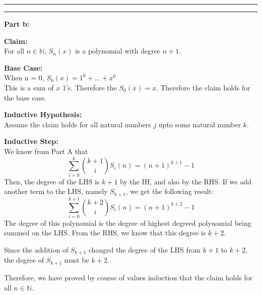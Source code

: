 \documentclass[11pt]{article}
\newcounter{questionCounter}
\newcounter{partCounter}[questionCounter]
\newenvironment{question}[2][\arabic{questionCounter}]{%
    \setcounter{partCounter}{0}%
    \vspace{.25in} \hrule \vspace{0.5em}%
        \noindent{\bf #2}%
    \vspace{0.8em} \hrule \vspace{.10in}%
    \addtocounter{questionCounter}{1}%
}{}
\begin{document}
\begin{question}{Apocalypse Averted}
\textbf{Part b:}

\textbf{Claim:}\\
For all $n \in \mathbb{N}$, $S_{n}(x)$ is a polynomial with degree $n+1$.

\textbf{Base Case:}\\
When n = 0, $S_{0}(x) = 1^0 + ... + x^0$\\
This is a sum of $x$ 1's. Therefore the $S_{0}(x)=x$. Therefore the claim holds 
for the base case.

\textbf{Inductive Hypothesis:}\\
Assume the claim holds for all natural numbers $j$ upto some natural number $k$.

\textbf{Inductive Step:}\\
We know from Part A that $$\sum_{i=0}^{k}\binom{k+1}{i}S_i(n) = (n+1)^{k+1} - 1$$
Then, the degree of the LHS is $k+1$ by the IH, and also by the RHS. 
If we add another term to the LHS, namely $S_{k+1}$, we get the following 
result:
$$\sum_{i=0}^{k+1}\binom{k+2}{i}S_i(n) = (n+1)^{k+2} - 1$$
The degree of this polynomial is the degree of highest degreed polynomial being 
summed on the LHS. From the RHS, we know that this degree is $k+2$.

Since the addition of $S_{k+1}$ changed the degree of the LHS from $k+1$ to $k+2$, 
the degree of $S_{k+1}$ must be $k+2$. 

Therefore, we have proved by 
course of values induction that the claim holds for all $n \in \mathbb{N}$.

\end{question}
\end{document}
